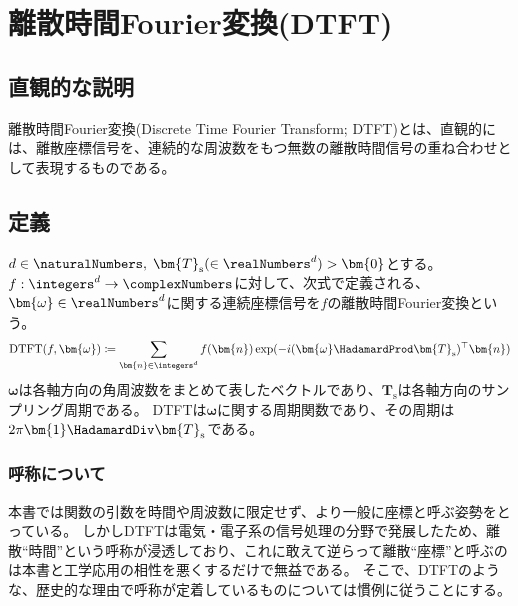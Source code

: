		\chapter{離散時間Fourier変換(DTFT)}
			\section{直観的な説明}
				離散時間Fourier変換(Discrete Time Fourier Transform; DTFT)とは、直観的には、離散座標信号を、連続的な周波数をもつ無数の離散時間信号の重ね合わせとして表現するものである。
			\section{定義}
				$d\in\naturalNumbers,\;\bm{T}_\text{s}(\in\realNumbers^d)>\bm{0}$とする。
				$f:\integers^d\to\complexNumbers$に対して、次式で定義される、$\bm{\omega}\in\realNumbers^d$に関する連続座標信号を$f$の離散時間Fourier変換という。
				\[ \text{DTFT}(f,\bm{\omega}) \coloneqq \sum_{\bm{n}\in\integers^d} f(\bm{n})\exp(-i(\bm{\omega}\HadamardProd\bm{T}_\text{s})^\top\bm{n}) \]
				$\bm{\omega}$は各軸方向の角周波数をまとめて表したベクトルであり、$\bm{T}_\text{s}$は各軸方向のサンプリング周期である。
				DTFTは$\bm{\omega}$に関する周期関数であり、その周期は$2\pi\bm{1}\HadamardDiv\bm{T}_\text{s}$である。
				\subsection{呼称について}
					本書では関数の引数を時間や周波数に限定せず、より一般に座標と呼ぶ姿勢をとっている。
					しかしDTFTは電気・電子系の信号処理の分野で発展したため、離散``時間''という呼称が浸透しており、これに敢えて逆らって離散``座標''と呼ぶのは本書と工学応用の相性を悪くするだけで無益である。
					そこで、DTFTのような、歴史的な理由で呼称が定着しているものについては慣例に従うことにする。
